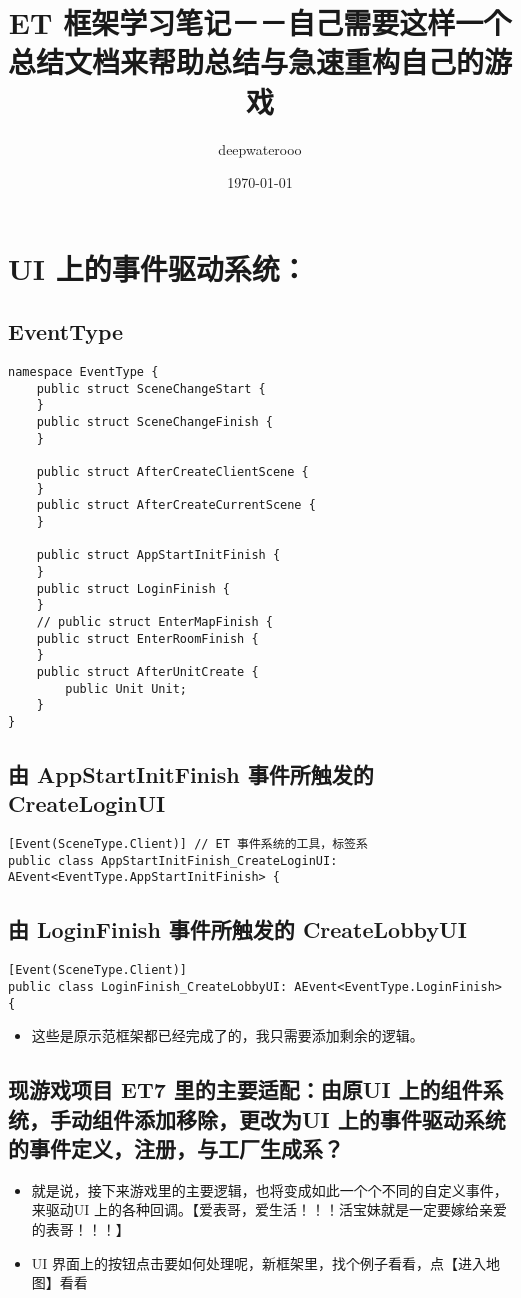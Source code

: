 \documentclass[9pt, b5paper]{article}
\author{deepwaterooo}
\date{\today}
\title{ET 框架学习笔记－－自己需要这样一个总结文档来帮助总结与急速重构自己的游戏}
\begin{document}
\maketitle
\tableofcontents


\section{UI 上的事件驱动系统：}
\label{sec:org11be625}
\subsection{EventType}
\label{sec:orged8ca99}
\begin{verbatim}
namespace EventType {
    public struct SceneChangeStart {
    }
    public struct SceneChangeFinish {
    }

    public struct AfterCreateClientScene {
    }
    public struct AfterCreateCurrentScene {
    }

    public struct AppStartInitFinish {
    }
    public struct LoginFinish {
    }
    // public struct EnterMapFinish {
    public struct EnterRoomFinish {
    }
    public struct AfterUnitCreate {
        public Unit Unit;
    }
}
\end{verbatim}
\subsection{由 AppStartInitFinish 事件所触发的 CreateLoginUI}
\label{sec:orgf9f170d}
\begin{verbatim}
[Event(SceneType.Client)] // ET 事件系统的工具，标签系
public class AppStartInitFinish_CreateLoginUI: AEvent<EventType.AppStartInitFinish> {
\end{verbatim}
\subsection{由 LoginFinish 事件所触发的 CreateLobbyUI}
\label{sec:orgf1eb6c2}
\begin{verbatim}
[Event(SceneType.Client)]
public class LoginFinish_CreateLobbyUI: AEvent<EventType.LoginFinish> {
\end{verbatim}
\begin{itemize}
\item 这些是原示范框架都已经完成了的，我只需要添加剩余的逻辑。
\end{itemize}
\subsection{现游戏项目 ET7 里的主要适配：由原UI 上的组件系统，手动组件添加移除，更改为UI 上的事件驱动系统的事件定义，注册，与工厂生成系？}
\label{sec:org014c33d}
\begin{itemize}
\item 就是说，接下来游戏里的主要逻辑，也将变成如此一个个不同的自定义事件，来驱动UI 上的各种回调。【爱表哥，爱生活！！！活宝妹就是一定要嫁给亲爱的表哥！！！】
\item UI 界面上的按钮点击要如何处理呢，新框架里，找个例子看看，点【进入地图】看看
\end{itemize}
\end{document}
